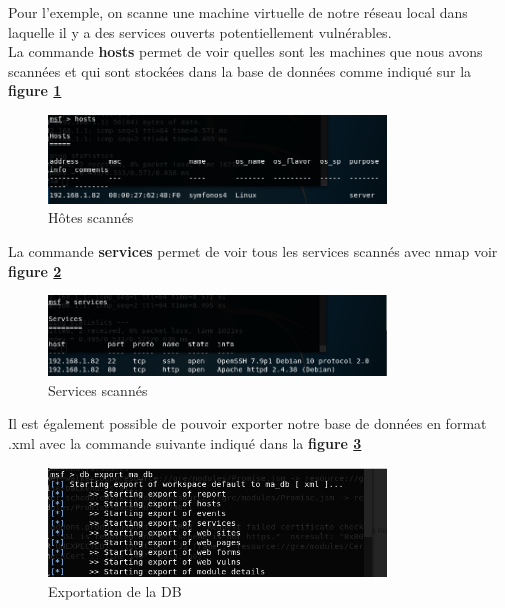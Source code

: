 Pour l'exemple, on scanne une machine virtuelle de notre réseau local dans laquelle il y a des services ouverts potentiellement vulnérables.\\

La commande \textbf{hosts} permet de voir quelles sont les machines que nous avons scannées et qui sont stockées dans la base de données comme indiqué sur la \textbf{figure \ref{fig:meta-hote}}\\

\begin{figure}[h]
  \centering
  \setlength\figureheight{7cm}
  \setlength\figurewidth{9cm}
  \includegraphics[width=0.8\textwidth]{oui/Ancien/imangeancien/metasploit/db_hosts.PNG}
  \caption{Hôtes scannés}
  \label{fig:meta-hote}
\end{figure}

La commande \textbf{services} permet de voir tous les services scannés avec nmap voir \textbf{figure \ref{fig:services-scan}}\\

\begin{figure}[h]
  \centering
  \setlength\figureheight{7cm}
  \setlength\figurewidth{9cm}
  \includegraphics[width=0.8\textwidth]{oui/Ancien/imangeancien/metasploit/db_services.PNG}
  \caption{Services scannés}
  \label{fig:services-scan}
\end{figure}

Il est également possible de pouvoir exporter notre base de données en format .xml avec la commande suivante indiqué dans la \textbf{figure \ref{fig:xml-db}}
\begin{figure}[h]
  \centering
  \setlength\figureheight{7cm}
  \setlength\figurewidth{9cm}
  \includegraphics[width=0.8\textwidth]{oui/Ancien/imangeancien/metasploit/db_export.PNG}
  \caption{Exportation de la DB}
  \label{fig:xml-db}
\end{figure}

